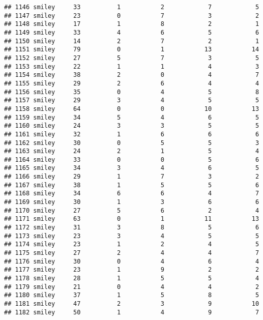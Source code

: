 \documentclass[
]{article}
\begin{document}
\begin{verbatim}
## 1146 smiley     33          1           2            7            5
## 1147 smiley     23          0           7            3            2
## 1148 smiley     17          1           8            2            1
## 1149 smiley     33          4           6            5            6
## 1150 smiley     14          2           7            2            1
## 1151 smiley     79          0           1           13           14
## 1152 smiley     27          5           7            3            5
## 1153 smiley     22          1           1            4            3
## 1154 smiley     38          2           0            4            7
## 1155 smiley     29          2           6            4            4
## 1156 smiley     35          0           4            5            8
## 1157 smiley     29          3           4            5            5
## 1158 smiley     64          0           0           10           13
## 1159 smiley     34          5           4            6            5
## 1160 smiley     24          3           3            5            5
## 1161 smiley     32          1           6            6            6
## 1162 smiley     30          0           5            5            3
## 1163 smiley     24          2           1            5            4
## 1164 smiley     33          0           0            5            6
## 1165 smiley     34          3           4            6            5
## 1166 smiley     29          1           7            3            2
## 1167 smiley     38          1           5            5            6
## 1168 smiley     34          6           6            4            7
## 1169 smiley     30          1           3            6            6
## 1170 smiley     27          5           6            2            4
## 1171 smiley     63          0           1           11           13
## 1172 smiley     31          3           8            5            6
## 1173 smiley     23          3           4            5            5
## 1174 smiley     23          1           2            4            5
## 1175 smiley     27          2           4            4            7
## 1176 smiley     30          0           4            6            4
## 1177 smiley     23          1           9            2            2
## 1178 smiley     28          1           5            5            4
## 1179 smiley     21          0           4            4            2
## 1180 smiley     37          1           5            8            5
## 1181 smiley     47          2           3            9           10
## 1182 smiley     50          1           4            9            7

\end{verbatim}
\end{document}
